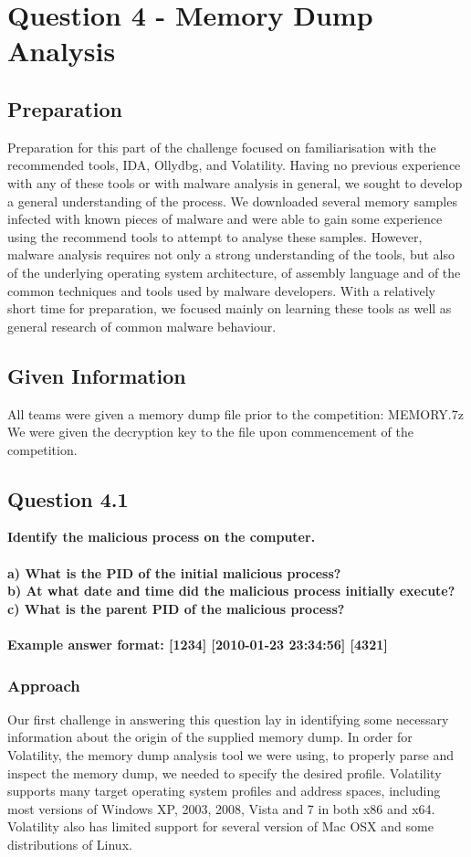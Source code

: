 \lstset{basicstyle=\tiny}

\chapter{Question 4 - Memory Dump Analysis}

\section{Preparation}
Preparation for this part of the challenge focused on familiarisation with the recommended tools, IDA, Ollydbg, and Volatility. Having no previous experience with any of these tools or with malware analysis in general, we sought to develop a general understanding of the process. We downloaded several memory samples infected with known pieces of malware and were able to gain some experience using the recommend tools to attempt to analyse these samples. However, malware analysis requires not only a strong understanding of the tools, but also of the underlying operating system architecture, of assembly language and of the common techniques and tools used by malware developers. With a relatively short time for preparation, we focused mainly on learning these tools as well as general research of common malware behaviour. 

\section{Given Information}
All teams were given a memory dump file prior to the competition: MEMORY.7z\\
We were given the decryption key to the file upon commencement of the
competition.

\section{Question 4.1}
\textbf{Identify the malicious process on the computer.
\\\\
a) What is the PID of the initial malicious process?
\\b) At what date and time did the malicious process initially execute?
\\c) What is the parent PID of the malicious process?
\\\\
Example answer format: [1234] [2010-01-23 23:34:56] [4321]}
\subsection{Approach}
Our first challenge in answering this question lay in identifying some necessary information about the origin of the supplied memory dump. In order for Volatility, the memory dump analysis tool we were using, to properly parse and inspect the memory dump, we needed to specify the desired profile. Volatility supports many target operating system profiles and address spaces, including most versions of Windows XP, 2003, 2008, Vista and 7 in both x86 and x64. Volatility also has limited support for several version of Mac OSX and some distributions of Linux.

